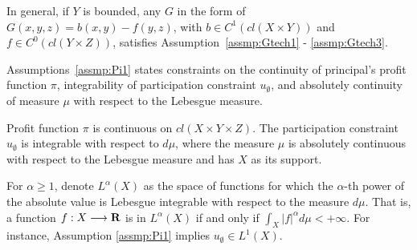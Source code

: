 In general, if $Y$ is bounded, any $G$ in the form of $G(x,y,z) = b(x,y) - f(y,z)$, with $b \in C^1(cl(X\times Y))$ and $f\in C^0(cl(Y \times Z))$, satisfies Assumption~\ref{assmp:Gtech1} - \ref{assmp:Gtech3}.\medskip



Assumptions~\ref{assmp:Pi1} states constraints on the continuity of principal's profit function $\pi$, integrability of participation constraint $u_{\emptyset}$, and absolutely continuity of measure $\mu$ with respect to the Lebesgue measure. 


\begin{assumption}\label{assmp:Pi1}
	Profit function $\pi$ is continuous on $cl(X\times Y\times Z)$. The participation constraint $u_{\emptyset}$ is integrable with respect to $d \mu$, where the measure $\mu$ is absolutely continuous with respect to the Lebesgue measure and has $X$ as its support.
\end{assumption}





For $\alpha \ge 1$, denote $L^{\alpha}(X)$ as the space of functions for which the $\alpha$-th power of the absolute value is Lebesgue integrable {with respect to the measure $d \mu$}. That is, a function $f: X\longrightarrow {\mathbf R}$ is in $L^{\alpha}(X)$ if and only if $\int_{X} |f|^{\alpha} d\mu <+\infty$. For instance, Assumption \ref{assmp:Pi1} implies $u_{\emptyset}\in L^{1}(X)$.\medskip








